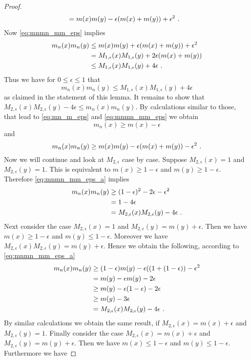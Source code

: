 \begin{lemma}
\begin{proof}
\begin{align*}
			&= m(x)m(y) - \epsilon(m(x) + m(y)) + \epsilon^2\textrm{ .}
		\end{align*}
		Now \eqref{eq:mnmn_mm_eps} implies 
		\begin{align*}
			m_n(x)m_n(y) &\leq m(x)m(y) + \epsilon(m(x) + m(y)) + \epsilon^2\\
			&= M_{1,\epsilon}(x)M_{1,\epsilon}(y) + 2\epsilon(m(x) + m(y))\\
			&\leq M_{1,\epsilon}(x)M_{1,\epsilon}(y) + 4\epsilon\textrm{ .}
		\end{align*}
		Thus we have for $0\leq \epsilon\leq 1$ that 
		$$m_n(x)m_n(y) \leq M_{1,\epsilon}(x)M_{1,\epsilon}(y) + 4\epsilon$$
		as claimed in the statement of this lemma. It remains to show that $M_{2,\epsilon}(x)M_{2,\epsilon}(y) - 4\epsilon \leq m_n(x)m_n(y)$. By calculations similar to those, that lead to \eqref{eq:mn_m_eps} and \eqref{eq:mnmn_mm_eps} we obtain
		$$m_n(x) \geq m(x) - \epsilon$$
		and
		\begin{equation}
			m_n(x)m_n(y) \geq m(x)m(y) - \epsilon(m(x) + m(y)) - \epsilon^2 \textrm{ .} \label{eq:mnmn_mm_eps_a}
		\end{equation}
		Now we will continue and look at $M_{2,\epsilon}$ case by case. Suppose $M_{2,\epsilon}(x) = 1$ and $M_{2,\epsilon}(y) = 1$. This is equivalent to $m(x) \geq 1 - \epsilon$ and $m(y) \geq 1 - \epsilon$. Therefore \eqref{eq:mnmn_mm_eps_a} implies 
		\begin{align*}
			m_n(x)m_n(y) &\geq (1-\epsilon)^2 - 2\epsilon - \epsilon^2\\
			&= 1 - 4\epsilon\\
			&= M_{2,\epsilon}(x)M_{2,\epsilon}(y) - 4\epsilon\textrm{ .}
		\end{align*}
		Next consider the case $M_{2,\epsilon}(x) = 1$ and $M_{2,\epsilon}(y) = m(y) + \epsilon$. Then we have $m(x) \geq 1-\epsilon$ and  $m(y) \leq 1-\epsilon$. Moreover we have $M_{2,\epsilon}(x)M_{2,\epsilon}(y) = m(y) + \epsilon$. Hence we obtain the following, according to \eqref{eq:mnmn_mm_eps_a}
		\begin{align*}
			m_n(x)m_n(y) &\geq (1-\epsilon)m(y) - \epsilon((1 + (1-\epsilon)) - \epsilon^2\\
			&= m(y)-\epsilon m(y) - 2\epsilon\\
			&\geq m(y)-\epsilon (1-\epsilon) - 2\epsilon\\
			&\geq m(y)-3\epsilon \\
			&= M_{2,\epsilon}(x)M_{2,\epsilon}(y) - 4\epsilon\textrm{ .}
		\end{align*} 
		By similar calculations we obtain the same result, if $M_{2,\epsilon}(x) = m(x) + \epsilon$ and $M_{2,\epsilon}(y) = 1$. Finally consider the case $M_{2,\epsilon}(x) = m(x) + \epsilon$ and $M_{2,\epsilon}(y) = m(y) + \epsilon$. Then we have $m(x) \leq 1-\epsilon$ and $m(y) \leq 1-\epsilon$. Furthermore we have 

\end{proof}
\end{lemma}
